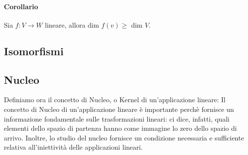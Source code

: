 \paragraph{Corollario}
Sia $f:V\to W$ lineare, allora dim $f(v) \geq$ dim $V$.

\subsection{Isomorfismi}


\subsection{Nucleo}
Definiamo ora il concetto di Nucleo, o Kernel di un'applicazione lineare:
Il concetto di Nucleo di un'applicazione lineare è importante perchè fornisce un informazione fondamentale sulle trasformazioni lineari: ci dice, infatti, quali elementi dello spazio di partenza hanno come immagine lo zero dello spazio di arrivo.
Inoltre, lo studio del nucleo fornisce un condizione necessaria e sufficiente relativa all'iniettività delle applicazioni lineari.

